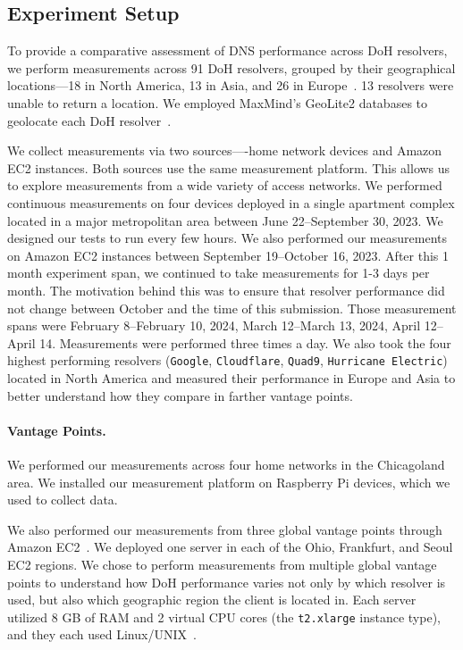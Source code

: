 \subsection{Experiment Setup}
To provide a comparative assessment of DNS
performance across DoH resolvers, we perform measurements across 91 DoH
resolvers, grouped by their geographical locations—18 in North America, 13 in
Asia, and 26 in Europe~\cite{dnscrypt}. 13 resolvers were unable to return a location. 
We employed MaxMind's GeoLite2 databases to geolocate each DoH resolver~\cite{maxmind}.

We collect measurements via two sources—-home network devices and Amazon EC2 instances. 
Both sources use the same measurement platform. This allows us to explore measurements from a wide variety
of access networks. We performed continuous measurements on four devices deployed in a single apartment complex located in a 
major metropolitan area between June 22--September 30, 2023. We designed our tests to run every few hours. We also performed our measurements on Amazon EC2 instances between September 19--October 16, 2023. 
After this 1 month experiment span, we continued to take measurements for 1-3 days per month. 
The motivation behind this was to ensure that resolver performance did not change between October
and the time of this submission. Those measurement spans were February 8--February 10, 2024, 
March 12--March 13, 2024, April 12--April 14. Measurements were performed three times a day. 
We also took the four highest performing resolvers (\texttt{Google}, \texttt{Cloudflare}, \texttt{Quad9},
\texttt{Hurricane Electric}) located in North America and measured their
performance in Europe and Asia to better understand how they compare in
farther vantage points. 

\paragraph{Vantage Points.} 
We performed our measurements across four home networks in the Chicagoland area. 
We installed our measurement platform on Raspberry Pi devices, which we used to 
collect data. 

We also performed our measurements from three global
vantage points through Amazon EC2~\cite{amazon_ec2}.  We deployed one server
in each of the Ohio, Frankfurt, and Seoul EC2 regions.  We chose to perform
measurements from multiple global vantage points to understand how DoH
performance varies not only by which resolver is used, but also which
geographic region the client is located in.  Each server utilized 8 GB of RAM
and 2 virtual CPU cores (the \texttt{t2.xlarge} instance type), and they each
used Linux/UNIX~\cite{amazon_ec2_instance_types}.

